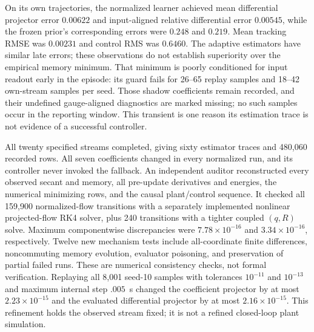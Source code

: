 \documentclass[journal]{IEEEtran}
\begin{document}
On its own trajectories, the normalized learner achieved mean differential
projector error $0.00622$ and input-aligned relative differential error
$0.00545$, while the frozen prior's corresponding errors were $0.248$ and
$0.219$. Mean tracking RMSE was $0.00231$ and control RMS was $0.6460$.
The adaptive estimators have similar late errors; these observations do not
establish superiority over the empirical memory minimum. That minimum is
poorly conditioned for input readout early in the episode: its guard fails
for 26--65 replay samples and 18--42 own-stream samples per seed. Those
shadow coefficients remain recorded, and their undefined gauge-aligned
diagnostics are marked missing; no such samples occur in the reporting
window. This transient is one reason its estimation trace is not evidence
of a successful controller.

All twenty specified streams completed, giving sixty estimator traces and
480,060 recorded rows. All seven coefficients changed in every normalized
run, and its controller never invoked the fallback. An independent auditor
reconstructed every observed secant and memory, all pre-update derivatives
and energies, the numerical minimizing rows, and the causal plant/control
sequence. It checked all 159,900 normalized-flow transitions with a separately
implemented nonlinear projected-flow RK4 solver, plus 240 transitions with
a tighter coupled $(q,R)$ solve. Maximum componentwise discrepancies were
$7.78\times10^{-16}$ and $3.34\times10^{-16}$, respectively. Twelve new
mechanism tests include all-coordinate finite differences, noncommuting
memory evolution, evaluator poisoning, and preservation of partial failed
runs. These are numerical consistency checks, not formal verification.
Replaying all 8,001 seed-10 samples with tolerances $10^{-11}$ and
$10^{-13}$ and maximum internal step $.005$~s changed the coefficient
projector by at most $2.23\times10^{-15}$ and the evaluated differential
projector by at most $2.16\times10^{-15}$. This refinement holds the
observed stream fixed; it is not a refined closed-loop plant simulation.
\end{document}
